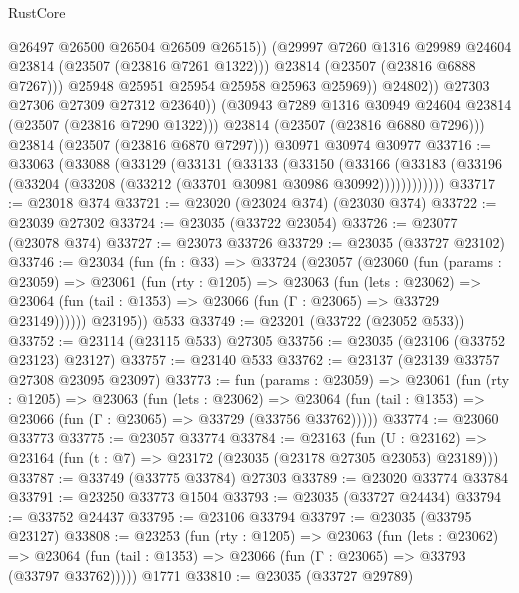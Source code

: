 \begin{lexlean}{RustCore}
\begin{coremodule}
                          @26497
                          @26500
                          @26504
                          @26509
                          @26515))
                      (@29997 @7260 @1316 @29989 @24604 @23814 (@23507 (@23816 @7261 @1322)))
                      @23814
                      (@23507 (@23816 @6888 @7267)))
                    @25948
                    @25951
                    @25954
                    @25958
                    @25963
                    @25969))
                @24802))
            @27303
            @27306
            @27309
            @27312
            @23640))
        (@30943 @7289 @1316 @30949 @24604 @23814 (@23507 (@23816 @7290 @1322)))
        @23814
        (@23507 (@23816 @6880 @7296)))
      @23814
      (@23507 (@23816 @6870 @7297)))
    @30971
    @30974
    @30977
@33716 := @33063
    (@33088
      (@33129
        (@33131
          (@33133
            (@33150
              (@33166
                (@33183 (@33196 (@33204 (@33208 (@33212 (@33701 @30981 @30986 @30992))))))))))))
@33717 := @23018 @374
@33721 := @23020 (@23024 @374) (@23030 @374)
@33722 := @23039 @27302
@33724 := @23035 (@33722 @23054)
@33726 := @23077 (@23078 @374)
@33727 := @23073 @33726
@33729 := @23035 (@33727 @23102)
@33746 := @23034
    (fun (fn : @33) =>
    @33724
      (@23057
        (@23060
          (fun (params : @23059) =>
          @23061
            (fun (rty : @1205) =>
            @23063
              (fun (lets : @23062) =>
              @23064 (fun (tail : @1353) => @23066 (fun (Γ : @23065) => @33729 @23149))))))
        @23195))
    @533
@33749 := @23201 (@33722 (@23052 @533))
@33752 := @23114 (@23115 @533) @27305
@33756 := @23035 (@23106 (@33752 @23123) @23127)
@33757 := @23140 @533
@33762 := @23137 (@23139 @33757 @27308 @23095 @23097)
@33773 := fun (params : @23059) =>
  @23061
    (fun (rty : @1205) =>
    @23063
      (fun (lets : @23062) =>
      @23064 (fun (tail : @1353) => @23066 (fun (Γ : @23065) => @33729 (@33756 @33762)))))
@33774 := @23060 @33773
@33775 := @23057 @33774
@33784 := @23163
    (fun (U : @23162) => @23164 (fun (t : @7) => @23172 (@23035 (@23178 @27305 @23053) @23189)))
@33787 := @33749 (@33775 @33784) @27303
@33789 := @23020 @33774 @33784
@33791 := @23250 @33773 @1504
@33793 := @23035 (@33727 @24434)
@33794 := @33752 @24437
@33795 := @23106 @33794
@33797 := @23035 (@33795 @23127)
@33808 := @23253
    (fun (rty : @1205) =>
    @23063
      (fun (lets : @23062) =>
      @23064 (fun (tail : @1353) => @23066 (fun (Γ : @23065) => @33793 (@33797 @33762)))))
    @1771
@33810 := @23035 (@33727 @29789)

\end{coremodule}
\end{lexlean}
